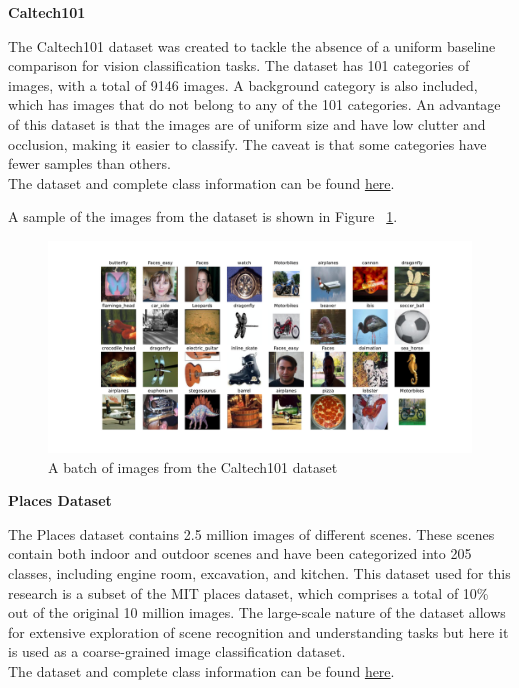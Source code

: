 \textbf{Caltech101}

The Caltech101 \cite{liCaltech101} dataset was created to tackle the absence of a uniform baseline comparison for vision classification tasks. The dataset has 101 categories of images, with a total of 9146 images. A background category is also included, which has images that do not belong to any of the 101 categories. An advantage of this dataset is that the images are of uniform size and have low clutter and occlusion, making it easier to classify. The caveat is that some categories have fewer samples than others.\\
The dataset and complete class information can be found \href{https://www.kaggle.com/datasets/862ae86edba271c39f76d0b530edeb55076b4b82b971160637210900747c44b1}{here}.

A sample of the images from the dataset is shown in Figure ~\ref{fig:calt}.

\begin{figure}[!htb]
    \centering
    \includegraphics[width=1\textwidth]{images/caltech101.pdf}
    \caption{A batch of images from the Caltech101 dataset}
    \label{fig:calt}
\end{figure}

\textbf{Places Dataset}

The Places dataset \cite{zhouPlaces10Million2018} contains 2.5 million images of different scenes. These scenes contain both indoor and outdoor scenes and have been categorized into 205 classes, including engine room, excavation, and kitchen. This dataset used for this research is a subset of the MIT places dataset, which comprises a total of 10\% out of the original 10 million images. The large-scale nature of the dataset allows for extensive exploration of scene recognition and understanding tasks but here it is used as a coarse-grained image classification dataset.\\
The dataset and complete class information can be found \href{https://www.kaggle.com/datasets/mittalshubham/images256}{here}.

